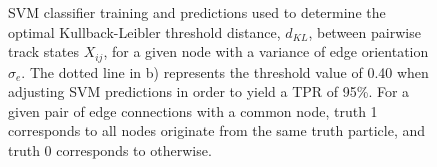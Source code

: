 \begin{figure}[htbp!] 
    \centering
    \hfill%
    \caption{SVM classifier training and predictions used to determine the optimal Kullback-Leibler threshold distance, $d_{KL}$, between pairwise track states $X_{ij}$, for a given node with a variance of edge orientation $\sigma_e$. The dotted line in b) represents the threshold value of 0.40 when adjusting SVM predictions in order to yield a TPR of 95\%. For a given pair of edge connections with a common node, truth 1 corresponds to all nodes originate from the same truth particle, and truth 0 corresponds to otherwise.}
    \label{fig:KL-distance}
\end{figure}









